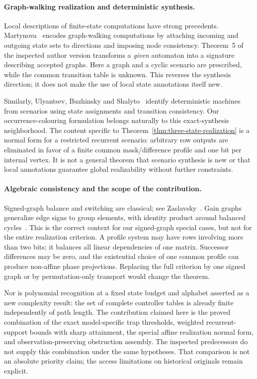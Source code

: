 \paragraph{Graph-walking realization and deterministic synthesis.}
Local descriptions of finite-state computations have strong precedents.
Martynova~\cite{Martynova2022} encodes graph-walking computations by attaching
incoming and outgoing state sets to directions and imposing node consistency.
Theorem~5 of the inspected author version transforms a \emph{given} automaton
into a signature describing accepted graphs. Here a graph and a cyclic scenario
are prescribed, while the common transition table is unknown. This reverses the
synthesis direction; it does not make the use of local state annotations itself
new.

Similarly, Ulyantsev, Buzhinsky and Shalyto~\cite{UlyantsevBuzhinskyShalyto2016}
identify deterministic machines from scenarios using state assignments and
transition consistency. Our occurrence-colouring formulation belongs naturally to
this exact-synthesis neighborhood. The content specific to
Theorem~\ref{thm:three-state-realization} is a normal form for a restricted recurrent
scenario: arbitrary row outputs are eliminated in favor of a finite common
mask/difference profile and one bit per internal vertex. It is not a general theorem
that scenario synthesis is new or that local annotations guarantee global
realizability without further constraints.

\paragraph{Algebraic consistency and the scope of the contribution.}
Signed-graph balance and switching are classical; see
Zaslavsky~\cite[Section~2, Proposition~2.1]{Zaslavsky1982}. Gain graphs generalize
edge signs to group elements, with identity product around balanced
cycles~\cite{Zaslavsky1989}. This is the correct context for our signed-graph
special cases, but not for the entire realization criterion. A profile system may
have rows involving more than two bits; it balances all linear dependencies of one
matrix. Successor differences may be zero, and the existential choice of one common
profile can produce non-affine phase projections. Replacing the full criterion by
one signed graph or by permutation-only transport would change the theorem.

Nor is polynomial recognition at a fixed state budget and alphabet asserted as a
new complexity result: the set of complete controller tables is already finite
independently of path length. The contribution claimed here is the proved
combination of the exact model-specific trap thresholds, weighted recurrent-support
bounds with sharp attainment, the special affine realization normal form, and
observation-preserving obstruction assembly. The inspected predecessors do not
supply this combination under the same hypotheses. That comparison is not an
absolute priority claim; the access limitations on historical originals remain
explicit.
